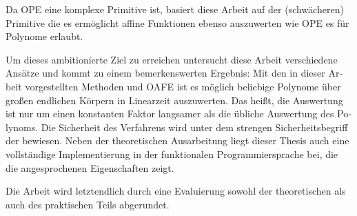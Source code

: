 \begin{otherlanguage}{ngerman}
Da OPE eine komplexe Primitive ist, basiert diese Arbeit auf der
(schwächeren) Primitive  die
es ermöglicht affine Funktionen ebenso auszuwerten wie OPE es für Polynome
erlaubt.

Um dieses ambitionierte Ziel zu erreichen untersucht diese Arbeit verschiedene
Ansätze und kommt zu einem bemerkenswerten Ergebnis: Mit den in dieser Arbeit
vorgestellten Methoden und OAFE ist es möglich beliebige Polynome über großen
endlichen Körpern in Linearzeit auszuwerten. Das heißt, die Auswertung ist nur
um einen konstanten Faktor langsamer als die übliche Auswertung des Polynoms.
Die Sicherheit des Verfahrens wird unter dem strengen Sicherheitsbegriff der
 \cite{canetti05} bewiesen. Neben der
theoretischen Ausarbeitung liegt dieser Thesis auch eine vollständige
Implementierung in der funktionalen Programmiersprache \JWThaskell{} bei, die
die angesprochenen Eigenschaften zeigt.

Die Arbeit wird letztendlich durch eine Evaluierung sowohl der theoretischen als
auch des praktischen Teils abgerundet.

\end{otherlanguage}

\cleardoublepage

